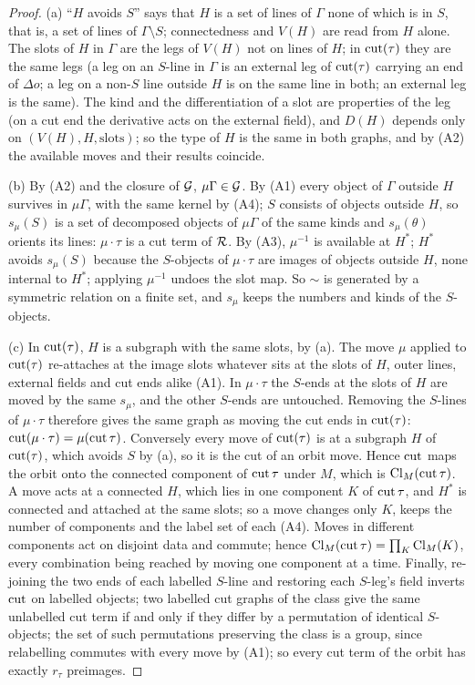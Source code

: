 \begin{proof}
(a) ``$H$ avoids $S$'' says that $H$ is a set of lines of $\Gamma$ none of which is in $S$, that is, a set of lines of $\Gamma\setminus S$; connectedness and $V(H)$ are read from $H$ alone. The slots of $H$ in $\Gamma$ are the legs of $V(H)$ not on lines of $H$; in $\operatorname{cut}(\tau)$ they are the same legs (a leg on an $S$-line in $\Gamma$ is an external leg of $\operatorname{cut}(\tau)$ carrying an end of $\Delta o$; a leg on a non-$S$ line outside $H$ is on the same line in both; an external leg is the same). The kind and the differentiation of a slot are properties of the leg (on a cut end the derivative acts on the external field), and $D(H)$ depends only on $(V(H),H,\text{slots})$; so the type of $H$ is the same in both graphs, and by (A2) the available moves and their results coincide.

(b) By (A2) and the closure of $\mathcal G$, $\mu\Gamma\in\mathcal G$. By (A1) every object of $\Gamma$ outside $H$ survives in $\mu\Gamma$, with the same kernel by (A4); $S$ consists of objects outside $H$, so $s_\mu(S)$ is a set of decomposed objects of $\mu\Gamma$ of the same kinds and $s_\mu(\theta)$ orients its lines: $\mu\cdot\tau$ is a cut term of $\mathcal R$. By (A3), $\mu^{-1}$ is available at $H^*$; $H^*$ avoids $s_\mu(S)$ because the $S$-objects of $\mu\cdot\tau$ are images of objects outside $H$, none internal to $H^*$; applying $\mu^{-1}$ undoes the slot map. So $\sim$ is generated by a symmetric relation on a finite set, and $s_\mu$ keeps the numbers and kinds of the $S$-objects.

(c) In $\operatorname{cut}(\tau)$, $H$ is a subgraph with the same slots, by (a). The move $\mu$ applied to $\operatorname{cut}(\tau)$ re-attaches at the image slots whatever sits at the slots of $H$, outer lines, external fields and cut ends alike (A1). In $\mu\cdot\tau$ the $S$-ends at the slots of $H$ are moved by the same $s_\mu$, and the other $S$-ends are untouched. Removing the $S$-lines of $\mu\cdot\tau$ therefore gives the same graph as moving the cut ends in $\operatorname{cut}(\tau)$: $\operatorname{cut}(\mu\cdot\tau)=\mu(\operatorname{cut}\tau)$. Conversely every move of $\operatorname{cut}(\tau)$ is at a subgraph $H$ of $\operatorname{cut}(\tau)$, which avoids $S$ by (a), so it is the cut of an orbit move. Hence $\operatorname{cut}$ maps the orbit onto the connected component of $\operatorname{cut}\tau$ under $M$, which is $\operatorname{Cl}_M(\operatorname{cut}\tau)$. A move acts at a connected $H$, which lies in one component $K$ of $\operatorname{cut}\tau$, and $H^*$ is connected and attached at the same slots; so a move changes only $K$, keeps the number of components and the label set of each (A4). Moves in different components act on disjoint data and commute; hence $\operatorname{Cl}_M(\operatorname{cut}\tau)=\prod_K\operatorname{Cl}_M(K)$, every combination being reached by moving one component at a time. Finally, re-joining the two ends of each labelled $S$-line and restoring each $S$-leg's field inverts $\operatorname{cut}$ on labelled objects; two labelled cut graphs of the class give the same unlabelled cut term if and only if they differ by a permutation of identical $S$-objects; the set of such permutations preserving the class is a group, since relabelling commutes with every move by (A1); so every cut term of the orbit has exactly $r_\tau$ preimages.


\end{proof}
